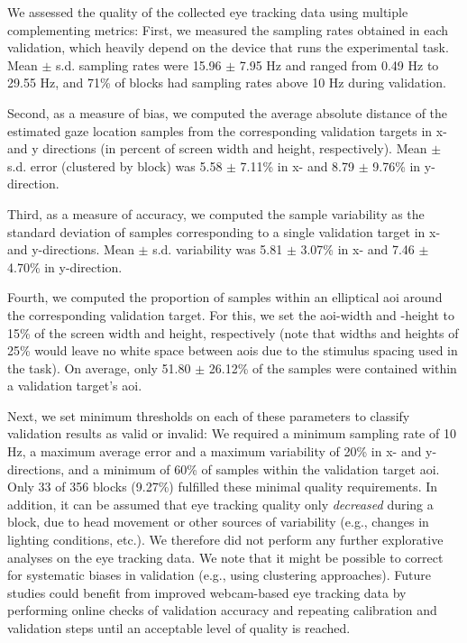 \documentclass[11pt, a4paper, twocolumn, abstract]{scrartcl}
\begin{document}
We assessed the quality of the collected eye tracking data using multiple complementing metrics: First, we measured the sampling rates obtained in each validation, which heavily depend on the device that runs the experimental task. Mean $\pm$ s.d. sampling rates were 15.96 $\pm$ 7.95 Hz and ranged from 0.49 Hz to 29.55 Hz, and 71\% of blocks had sampling rates above 10 Hz during validation.

Second, as a measure of bias, we computed the average absolute distance of the estimated gaze location samples from the corresponding validation targets in x- and y directions (in percent of screen width and height, respectively). Mean $\pm$ s.d. error (clustered by block) was 5.58 $\pm$ 7.11\% in x- and 8.79 $\pm$ 9.76\% in y-direction. 

Third, as a measure of accuracy, we computed the sample variability as the standard deviation of samples corresponding to a single validation target in x- and y-directions. Mean $\pm$ s.d. variability was 5.81 $\pm$ 3.07\% in x- and 7.46 $\pm$ 4.70\% in y-direction. 

Fourth, we computed the proportion of samples within an elliptical \gls{aoi} around the corresponding validation target. For this, we set the \gls{aoi}-width and -height to 15\% of the screen width and height, respectively (note that widths and heights of 25\% would leave no white space between \glspl{aoi} due to the stimulus spacing used in the task). On average, only 51.80 $\pm$ 26.12\% of the samples were contained within a validation target's \gls{aoi}.

Next, we set minimum thresholds on each of these parameters to classify validation results as valid or invalid: We required a minimum sampling rate of 10 Hz, a maximum average error and a maximum variability of 20\% in x- and y-directions, and a minimum of 60\% of samples within the validation target \gls{aoi}. Only 33 of 356 blocks (9.27\%) fulfilled these minimal quality requirements. In addition, it can be assumed that eye tracking quality only \emph{decreased} during a block, due to head movement or other sources of variability (e.g., changes in lighting conditions, etc.). We therefore did not perform any further explorative analyses on the eye tracking data. We note that it might be possible to correct for systematic biases in validation (e.g., using clustering approaches). Future studies could benefit from improved webcam-based eye tracking data by performing online checks of validation accuracy and repeating calibration and validation steps until an acceptable level of quality is reached.
\end{document}
